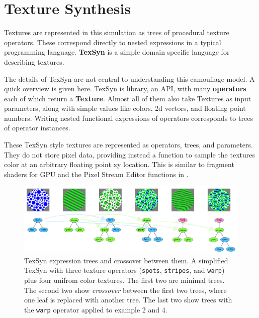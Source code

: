\documentclass[sigconf]{acmart}
\begin{document}
\section{Texture Synthesis}
Textures are represented in this simulation as trees of procedural texture operators. These correspond directly to nested expressions in a typical programming language. \textbf{TexSyn} is a simple domain specific language for describing textures.
\par
The details of TexSyn are not central to understanding this camouflage model. A quick overview is given here. TexSyn is library, an API, with many \textbf{operators} each of which return a \textbf{Texture}. Almost all of them also take Textures as input parameters, along with simple values like colors, 2d vectors, and floating point numbers. Writing nested functional expressions of operators corresponds to trees of operator instances.
\par
These TexSyn style textures are represented as operators, trees, and parameters. They do not store pixel data, providing instead a function to sample the textures color at an arbitrary floating point xy location. This is similar to fragment shaders for GPU and the Pixel Stream Editor functions in \cite{perlin_image_1985}.
\par
[... see Figure \ref{fig:TexSyn_overview} ...]
\par
\begin{figure}
    \includegraphics[width=\textwidth]{images/texsyn_overview.pdf}
    \caption{TexSyn expression trees and crossover between them. A simplified TexSyn with three texture operators (\texttt{spots}, \texttt{stripes}, and \texttt{warp}) plus four unifrom color textures. The first two are minimal trees. The second two show \textit{crossover} between the first two trees, where one leaf is replaced with another tree. The last two show trees with the \texttt{warp} operator applied to example 2 and 4.}
    \label{fig:TexSyn_overview}
\end{figure}
\end{document}
